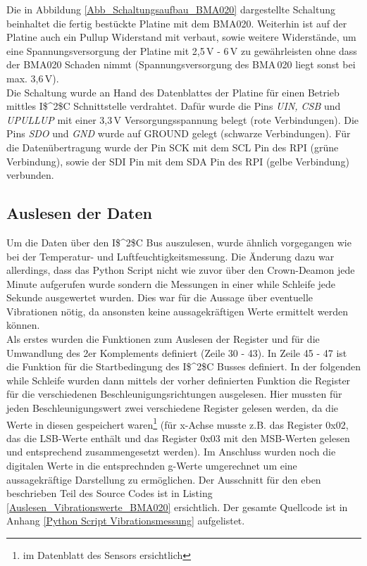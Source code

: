 Die in Abbildung \ref{Abb_Schaltungsaufbau_BMA020} dargestellte Schaltung beinhaltet die fertig bestückte Platine mit dem BMA020. Weiterhin ist auf der Platine auch ein Pullup Widerstand mit verbaut, sowie weitere Widerstände, um eine Spannungsversorgung der Platine mit 2,5\,V - 6\,V zu gewährleisten ohne dass der BMA020 Schaden nimmt (Spannungsversorgung des BMA\,020 liegt sonst bei max. 3,6\,V).\\
Die Schaltung wurde an Hand des Datenblattes der Platine für einen Betrieb mittles \ac{I$^2$C} Schnittstelle verdrahtet. Dafür wurde die Pins \textit{UIN, CSB} und \textit{UPULLUP} mit einer 3,3\,V Versorgungsspannung belegt (rote Verbindungen). Die Pins \textit{SDO} und \textit{GND} wurde auf GROUND gelegt (schwarze Verbindungen). Für die Datenübertragung wurde der Pin SCK mit dem SCL Pin des \ac{RPI} (grüne Verbindung), sowie der SDI Pin mit dem SDA Pin des \ac{RPI} (gelbe Verbindung) verbunden.

\subsection{Auslesen der Daten}
\label{subsection_Auslesen_Daten_BMA020}

Um die Daten über den \ac{I$^2$C} Bus auszulesen, wurde ähnlich vorgegangen wie bei der Temperatur- und Luftfeuchtigkeitsmessung. Die Änderung dazu war allerdings, dass das Python Script nicht wie zuvor über den Crown-Deamon jede Minute aufgerufen wurde sondern die Messungen in einer while Schleife jede Sekunde ausgewertet wurden. Dies war für die Aussage über eventuelle Vibrationen nötig, da ansonsten keine aussagekräftigen Werte ermittelt werden können.\\
Als erstes wurden die Funktionen zum Auslesen der Register und für die Umwandlung des 2er Komplements definiert (Zeile 30 - 43). In Zeile 45 - 47 ist die Funktion für die Startbedingung des \ac{I$^2$C} Busses definiert. In der folgenden while Schleife wurden dann mittels der vorher definierten Funktion die Register für die verschiedenen Beschleunigungsrichtungen ausgelesen. Hier mussten für jeden Beschleunigungswert zwei verschiedene Register gelesen werden, da die Werte in diesen gespeichert waren\footnote{im Datenblatt des Sensors ersichtlich} (für x-Achse musste z.B. das Register 0x02, das die LSB-Werte enthält und das Register 0x03 mit den MSB-Werten gelesen und entsprechend zusammengesetzt werden). Im Anschluss wurden noch die digitalen Werte in die entsprechnden g-Werte umgerechnet um eine aussagekräftige Darstellung zu ermöglichen. Der Ausschnitt für den eben beschrieben Teil des Source Codes ist in Listing \ref{Auslesen_Vibrationswerte_BMA020} ersichtlich. Der gesamte Quellcode ist in Anhang \ref{Python Script Vibrationsmessung} aufgelistet.

